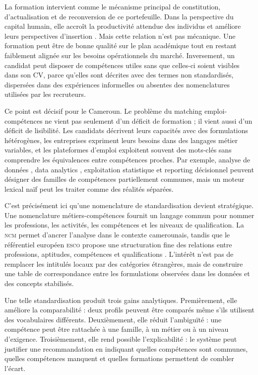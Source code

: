 \documentclass[12pt,twoside]{report}
\newcommand{\ESCO}{\textsc{esco}}
\newcommand{\NCM}{\textsc{ncm}}
\begin{document}
La formation intervient comme le mécanisme principal de constitution, d'actualisation et de reconversion de ce portefeuille. Dans la perspective du capital humain, elle accroît la productivité attendue des individus et améliore leurs perspectives d'insertion \cite{becker1964human}. Mais cette relation n'est pas mécanique. Une formation peut être de bonne qualité sur le plan académique tout en restant faiblement alignée sur les besoins opérationnels du marché. Inversement, un candidat peut disposer de compétences utiles sans que celles-ci soient visibles dans son CV, parce qu'elles sont décrites avec des termes non standardisés, dispersées dans des expériences informelles ou absentes des nomenclatures utilisées par les recruteurs.

Ce point est décisif pour le Cameroun. Le problème du matching emploi-compétences ne vient pas seulement d'un déficit de formation ; il vient aussi d'un déficit de lisibilité. Les candidats décrivent leurs capacités avec des formulations hétérogènes, les entreprises expriment leurs besoins dans des langages métier variables, et les plateformes d'emploi exploitent souvent des mots-clés sans comprendre les équivalences entre compétences proches. Par exemple, \og analyse de données \fg{}, \og data analytics \fg{}, \og exploitation statistique \fg{} et \og reporting décisionnel \fg{} peuvent désigner des familles de compétences partiellement communes, mais un moteur lexical naïf peut les traiter comme des réalités séparées.

C'est précisément ici qu'une nomenclature de standardisation devient stratégique. Une nomenclature métiers-compétences fournit un langage commun pour nommer les professions, les activités, les compétences et les niveaux de qualification. La \NCM{} permet d'ancrer l'analyse dans le contexte camerounais, tandis que le référentiel européen \ESCO{} propose une structuration fine des relations entre professions, aptitudes, compétences et qualifications \cite{europeancommission2024esco}. L'intérêt n'est pas de remplacer les intitulés locaux par des catégories étrangères, mais de construire une table de correspondance entre les formulations observées dans les données et des concepts stabilisés.

Une telle standardisation produit trois gains analytiques. Premièrement, elle améliore la comparabilité : deux profils peuvent être comparés même s'ils utilisent des vocabulaires différents. Deuxièmement, elle réduit l'ambiguïté : une compétence peut être rattachée à une famille, à un métier ou à un niveau d'exigence. Troisièmement, elle rend possible l'explicabilité : le système peut justifier une recommandation en indiquant quelles compétences sont communes, quelles compétences manquent et quelles formations permettent de combler l'écart.
\end{document}
